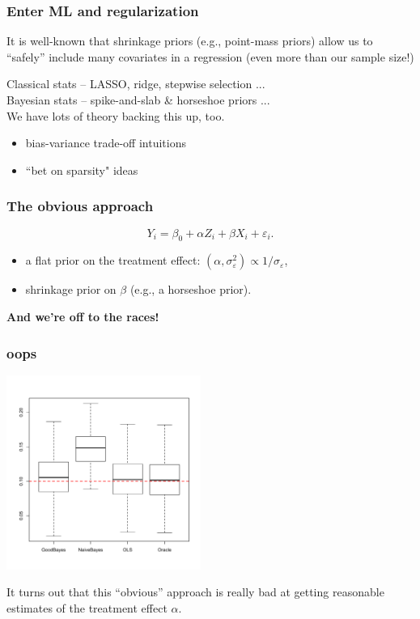 \documentclass{beamer}
\newcommand{\bo}[1]{\textcolor{burntorange}{#1}}
\newcommand{\sk}{\vspace{.5cm}}
\newcommand{\sko}{\vspace{.1in}}
\begin{document}
\begin{frame}
\frametitle{Enter ML and regularization}
It is well-known that shrinkage priors (e.g., point-mass priors) allow us to ``safely'' include many covariates in a regression (even more than our sample size!) \sk\sk

\bo{Classical stats} -- LASSO, ridge, stepwise selection ... \\ 
\bo{Bayesian stats} -- spike-and-slab \& horseshoe priors ...\\ 

\sk\sk
We have lots of theory backing this up, too.\sko
\begin{itemize}
\item bias-variance trade-off intuitions
\item  ``bet on sparsity" ideas
\end{itemize}
\vfill
\end{frame}


\begin{frame}
\frametitle{The obvious approach}
$$Y_i = \beta_0 + \alpha Z_i + \beta X_i + \varepsilon_i.$$ 
\vfill
\begin{itemize}\addtolength{\itemsep}{1.25\baselineskip}
\item a flat prior on the treatment effect: $(\alpha, \sigma^2_{\varepsilon}) \propto 1/\sigma_{\varepsilon}$,
\item shrinkage prior on $\beta$ (e.g., a horseshoe prior).
\end{itemize}
\vfill

\begin{center}
{\bf And we're off to the races!}
\end{center}
\end{frame}



\begin{frame}
\frametitle{oops}
\begin{center}
\includegraphics[width=2.5in]{figures/DominiciSims2_Estimates.pdf}
\end{center}
\vfill 
It turns out that this ``obvious'' approach is really bad at getting reasonable estimates of the treatment effect $\alpha$.
\vfill
\end{frame}
\end{document}

